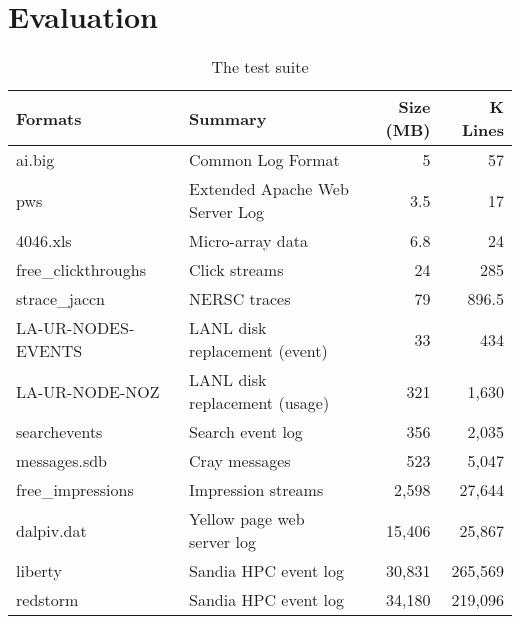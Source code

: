 \section{Evaluation} \label{sec:eval}

\begin{table*}[t]
\begin{center}
\begin{tabular}{|l|l|r|r|}\hline
{\bf Formats} & {\bf Summary} & {\bf Size (MB)} & {\bf K Lines} \\ \hline \hline 
ai.big 	& Common Log Format	& 5	& 57\\ \hline
pws  	& Extended Apache Web Server Log & 3.5 & 17 \\ \hline
4046.xls & Micro-array data & 6.8 & 24 \\ \hline
free\_clickthroughs & Click streams &  24 & 285 \\ \hline
strace\_jaccn &	NERSC traces & 79 & 896.5 \\ \hline
LA-UR-NODES-EVENTS & LANL disk replacement (event) & 33 & 434 \\ \hline
LA-UR-NODE-NOZ & LANL disk replacement (usage) & 321 & 1,630 \\ \hline
searchevents & Search event log & 356 & 2,035 \\ \hline
messages.sdb & Cray messages & 523 &  5,047\\ \hline
free\_impressions & Impression streams & 2,598 & 27,644 \\ \hline
dalpiv.dat & Yellow page web server log & 15,406 & 25,867 \\ \hline
liberty & Sandia HPC event log & 30,831 & 265,569 \\ \hline
redstorm & Sandia HPC event log & 34,180 & 219,096 \\ \hline
\end{tabular}
\end{center}
\caption{The test suite}
\end{table*}

